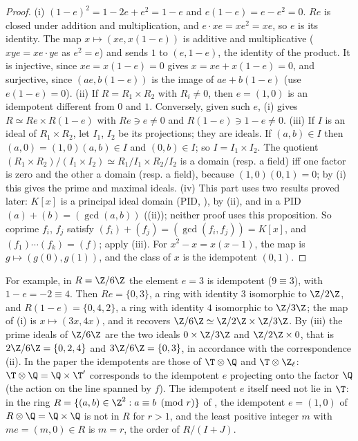 \begin{proof}
(i) $(1-e)^2=1-2e+e^2=1-e$ and $e(1-e)=e-e^2=0$. $Re$ is closed under addition and multiplication, and $e\cdot xe=xe^2=xe$, so
$e$ is its identity. The map $x\mapsto(xe,x(1-e))$ is additive and multiplicative ($xye=xe\cdot ye$ as $e^2=e$) and sends $1$ to
$(e,1-e)$, the identity of the product. It is injective, since $xe=x(1-e)=0$ gives $x=xe+x(1-e)=0$, and surjective, since
$(ae,b(1-e))$ is the image of $ae+b(1-e)$ (use $e(1-e)=0$).
(ii) If $R=R_1\times R_2$ with $R_i\ne0$, then $e=(1,0)$ is an idempotent different from $0$ and $1$. Conversely, given such $e$,
(i) gives $R\simeq Re\times R(1-e)$ with $Re\ni e\ne0$ and $R(1-e)\ni1-e\ne0$.
(iii) If $I$ is an ideal of $R_1\times R_2$, let $I_1$, $I_2$ be its projections; they are ideals. If $(a,b)\in I$ then
$(a,0)=(1,0)(a,b)\in I$ and $(0,b)\in I$; so $I=I_1\times I_2$. The quotient $(R_1\times R_2)/(I_1\times I_2)\simeq R_1/I_1\times R_2/I_2$ is a domain
(resp. a field) iff one factor is zero and the other a domain (resp. a field), because $(1,0)(0,1)=0$; by
(i) this gives the prime and maximal ideals.
(iv) This part uses two results proved later: $K[x]$ is a principal ideal domain (PID, ), by
(ii), and in a PID $(a)+(b)=(\gcd(a,b))$ ((ii)); neither proof uses this
proposition. So coprime $f_i$, $f_j$ satisfy $(f_i)+(f_j)=(\gcd(f_i,f_j))=K[x]$, and
$(f_1)\cdots(f_k)=(f)$; apply (iii). For $x^2-x=x(x-1)$, the map is $g\mapsto(g(0),g(1))$, and the class of $x$
is the idempotent $(0,1)$.
\end{proof}

For example, in $R=\Z/6\Z$ the element $e=3$ is idempotent ($9\equiv3$), with $1-e=-2\equiv4$. Then $Re=\{0,3\}$, a ring with identity $3$
isomorphic to $\Z/2\Z$, and $R(1-e)=\{0,4,2\}$, a ring with identity $4$ isomorphic to $\Z/3\Z$; the map of (i) is $x\mapsto(3x,4x)$, and it
recovers $\Z/6\Z\simeq\Z/2\Z\times\Z/3\Z$. By (iii) the prime ideals of $\Z/6\Z$ are the two ideals $0\times\Z/3\Z$ and $\Z/2\Z\times0$, that is
$2\Z/6\Z=\{0,2,4\}$ and $3\Z/6\Z=\{0,3\}$, in accordance with the correspondence (ii). In the paper the idempotents are
those of $\T\otimes\Q$ and $\T\otimes\Z_\ell$: $\T\otimes\Q=\Q\times\T'$ corresponds to the idempotent $e$ projecting onto the factor $\Q$ (the action on the line
spanned by $f$). The idempotent $e$ itself need not lie in $\T$: in the ring $R=\{(a,b)\in\Z^2:a\equiv b\pmod r\}$ of , the idempotent
$e=(1,0)$ of $R\otimes\Q=\Q\times\Q$ is not in $R$ for $r>1$, and the least positive integer $m$ with $me=(m,0)\in R$ is $m=r$, the order of $R/(I+J)$.

